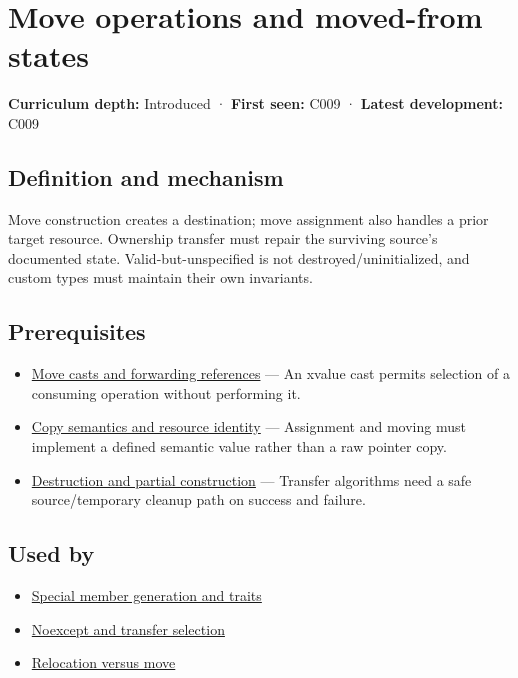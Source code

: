 \hypertarget{appendix-5636651017c2}{}\label{referencestart:appendix-5636651017c2}
\section{Move operations and moved-from states}\label{appendix-5636651017c2-move-operations-and-moved-from-states}

\textbf{Curriculum depth:} Introduced · \textbf{First seen:} C009 · \textbf{Latest development:} C009

\subsection{Definition and mechanism}\label{appendix-5636651017c2-definition-and-mechanism}

Move construction creates a destination; move assignment also handles a prior target resource. Ownership transfer must repair the surviving source's documented state. Valid-but-unspecified is not destroyed/uninitialized, and custom types must maintain their own invariants.

\subsection{Prerequisites}\label{appendix-5636651017c2-prerequisites}

\begin{itemize}
\tightlist
\item
  \hyperref[appendix-0104b704fb11]{Move casts and forwarding references} --- An xvalue cast permits selection of a consuming operation without performing it.
\item
  \hyperref[appendix-1340cd1ce582]{Copy semantics and resource identity} --- Assignment and moving must implement a defined semantic value rather than a raw pointer copy.
\item
  \hyperref[appendix-9bfe377cef7a]{Destruction and partial construction} --- Transfer algorithms need a safe source/temporary cleanup path on success and failure.
\end{itemize}

\subsection{Used by}\label{appendix-5636651017c2-used-by}

\begin{itemize}
\tightlist
\item
  \hyperref[appendix-42e02a12c694]{Special member generation and traits}
\item
  \hyperref[appendix-c746afaa47d1]{Noexcept and transfer selection}
\item
  \hyperref[appendix-adfd6397af8d]{Relocation versus move}
\end{itemize}

